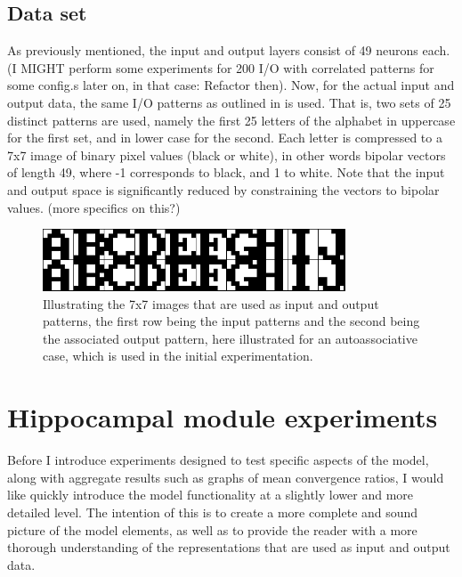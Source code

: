 \subsection{Data set}
As previously mentioned, the input and output layers consist of 49 neurons each. (I MIGHT perform some experiments for 200 I/O with correlated patterns for some config.s later on, in that case: Refactor then). Now, for the actual input and output data, the same I/O patterns as outlined in \citep{Hattori2010, Hattori2014} is used. That is, two sets of 25 distinct patterns are used, namely the first 25 letters of the alphabet in uppercase for the first set, and in lower case for the second. Each letter is compressed to a 7x7 image of binary pixel values (black or white), in other words bipolar vectors of length 49, where -1 corresponds to black, and 1 to white. Note that the input and output space is significantly reduced by constraining the vectors to bipolar values. (more specifics on this?)

\begin{figure}\label{fig:sample_letters}
    \centering
    \includegraphics[width=9cm]{fig/im_both.png}
    \caption{Illustrating the 7x7 images that are used as input and output patterns, the first row being the input patterns and the second being the associated output pattern, here illustrated for an autoassociative case, which is used in the initial experimentation.}
\end{figure}


\section{Hippocampal module experiments}\label{section:hpc-experiments}

Before I introduce experiments designed to test specific aspects of the model, along with aggregate results such as graphs of mean convergence ratios, I would like quickly introduce the model functionality at a slightly lower and more detailed level. The intention of this is to create a more complete and sound picture of the model elements, as well as to provide the reader with a more thorough understanding of the representations that are used as input and output data. 

